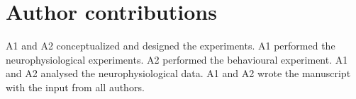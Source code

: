 \section*{Author contributions}
\label{sec:authorcontributions}
A1 and A2 conceptualized and designed the experiments.
A1 performed the neurophysiological experiments.
A2 performed the behavioural experiment.
A1 and A2 analysed the neurophysiological data.
A1 and A2 wrote the manuscript with the input from all authors.
